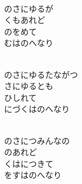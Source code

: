 \documentclass[10pt,b5j]{tarticle} %
\begin{document}
\vspace{1.5em} %
\newcommand{\linespace}{0.5em} %
\newcommand{\blocksize}{0.5\hsize} %
\newcommand{\itemmargin}{3em} %
\begin{enumerate} %
    \setlength{\itemindent}{\itemmargin} %
    \begin{minipage}[c]{\blocksize}
    
        \vspace{\linespace}
        \item~\\
        のさにゆるが\\
        くもあれど\\
        のをめて\\
        むはのへなり
        
    \end{minipage}
    \begin{minipage}[c]{\blocksize}
        
        \vspace{\linespace}
        \item~\\
        のさにゆるたながつ\\
        さにゆるとも\\
        ひしれて\\
        にづくはのへなり
        
    \end{minipage}
    \begin{minipage}[c]{\blocksize}
        
        \vspace{\linespace}
        \item~\\
        のさにつみんなの\\
        のあれど\\
        くはにつきて\\
        をすはのへなり
        

\end{minipage}
\end{enumerate}
\end{document}
